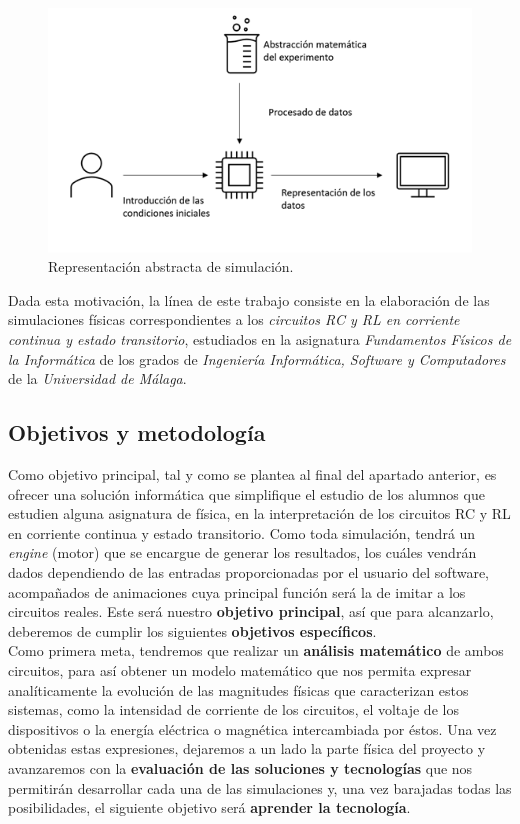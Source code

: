 \documentclass[../main.tex]{subfiles}
\begin{document}
\begin{figure}
    \centering
    \includegraphics{images/Figura1.1.png}
    \caption{Representación abstracta de simulación.}
    \label{fig:1.1}
\end{figure}

Dada esta motivación, la línea de este trabajo consiste en la elaboración de las simulaciones físicas correspondientes a los \textit{circuitos RC y RL en corriente continua y estado transitorio},  estudiados en la asignatura \textit{Fundamentos Físicos de la Informática} de los grados de \textit{Ingeniería Informática, Software y Computadores} de la \textit{Universidad de Málaga}.

\subsection{Objetivos y metodología}

Como objetivo principal, tal y como se plantea al final del apartado anterior, es ofrecer una solución informática que simplifique el estudio de los alumnos que estudien alguna asignatura de física, en la interpretación de los circuitos RC y RL en corriente continua y estado transitorio. Como toda simulación, tendrá un \textit{engine} (motor) que se encargue de generar los resultados, los cuáles vendrán dados dependiendo de las entradas proporcionadas por el usuario del software, acompañados de animaciones cuya principal función será la de imitar a los circuitos reales. Este será nuestro \textbf{objetivo principal}, así que para alcanzarlo, deberemos de cumplir los siguientes \textbf{objetivos específicos}.\\

Como primera meta, tendremos que realizar un \textbf{análisis matemático} de ambos circuitos, para así obtener un modelo matemático que nos permita expresar analíticamente la evolución de las magnitudes físicas que caracterizan estos sistemas, como la intensidad de corriente de los circuitos, el voltaje de los dispositivos o la energía eléctrica o magnética intercambiada por éstos. Una vez obtenidas estas expresiones, dejaremos a un lado la parte física del proyecto y avanzaremos con la \textbf{evaluación de las soluciones y tecnologías} que nos permitirán desarrollar cada una de las simulaciones y, una vez barajadas todas las posibilidades, el siguiente objetivo será \textbf{aprender la tecnología}. 
\end{document}
